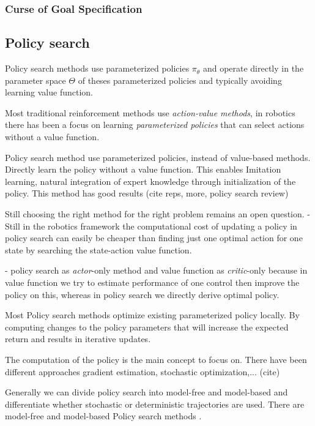\subsubsection{Curse of Goal Specification}

\subsection{Policy search}
Policy search methods use parameterized policies $\pi_{\theta}$ and operate
directly in the parameter space $\Theta$ of theses parameterized policies and
typically avoiding learning value function.

Most traditional reinforcement methods use \textit{action-value methods}, in robotics
there has been a focus on learning \textit{parameterized policies} that can select
actions without a value function.

Policy search method use parameterized policies, instead
of value-based methods. Directly learn the policy without a value function.
This enables Imitation learning, natural integration of expert knowledge through
initialization of the policy.
This method has good results (cite reps, more, policy search review)

Still choosing the right method for the right problem remains an open question.
- Still in the robotics framework the computational cost of updating
a policy in policy search can easily be cheaper than finding just one
optimal action for one state by searching the state-action value function.

- policy search as \textit{actor}-only method and value function as \textit{critic}-only
because in value function we try to estimate performance of one control then improve
the policy on this, whereas in policy search we directly derive optimal policy.

Most Policy search methods optimize existing parameterized policy locally. By computing
changes to the policy parameters that will increase the expected return and results
in iterative updates.

The computation of the policy is the main concept to focus on. There have
been different approaches gradient estimation, stochastic optimization,... (cite)

Generally we can divide policy search into model-free and model-based and
differentiate whether stochastic or deterministic trajectories are used.
There are model-free and model-based Policy search methods \citet{deisenroth2013survey}.

